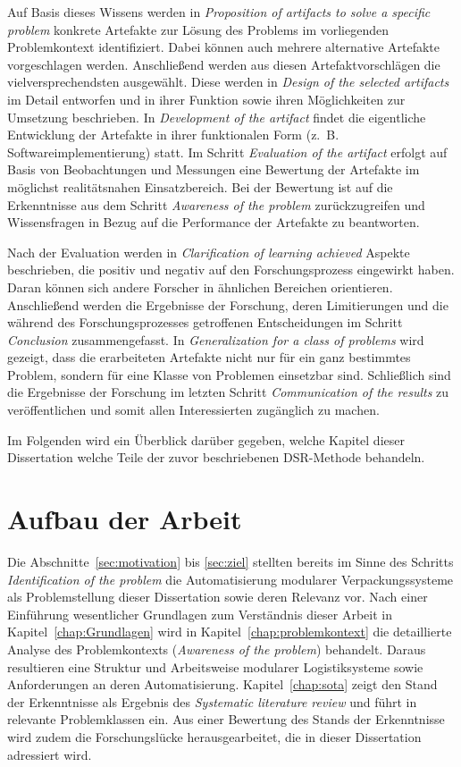 Auf Basis dieses Wissens werden in \emph{Proposition of artifacts to solve a specific problem} konkrete Artefakte zur Lösung des Problems im vorliegenden Problemkontext identifiziert. Dabei können auch mehrere alternative Artefakte vorgeschlagen werden. Anschließend werden aus diesen Artefaktvorschlägen die vielversprechendsten ausgewählt. Diese werden in \emph{Design of the selected artifacts} im Detail entworfen und in ihrer Funktion sowie ihren Möglichkeiten zur Umsetzung beschrieben. In \emph{Development of the artifact} findet die eigentliche Entwicklung der Artefakte in ihrer funktionalen Form (z.~B. Softwareimplementierung) statt. Im Schritt \emph{Evaluation of the artifact} erfolgt auf Basis von Beobachtungen und Messungen eine Bewertung der Artefakte im möglichst realitätsnahen Einsatzbereich. Bei der Bewertung ist auf die Erkenntnisse aus dem Schritt \emph{Awareness of the problem} zurückzugreifen und Wissensfragen in Bezug auf die Performance der Artefakte zu beantworten. 

Nach der Evaluation werden in \emph{Clarification of learning achieved} Aspekte beschrieben, die positiv und negativ auf den Forschungsprozess eingewirkt haben. Daran können sich andere Forscher in ähnlichen Bereichen orientieren. Anschließend werden die Ergebnisse der Forschung, deren Limitierungen und die während des Forschungsprozesses getroffenen Entscheidungen im Schritt \emph{Conclusion} zusammengefasst. In \emph{Generalization for a class of problems} wird gezeigt, dass die erarbeiteten Artefakte nicht nur für ein ganz bestimmtes Problem, sondern für eine Klasse von Problemen einsetzbar sind. Schließlich sind die Ergebnisse der Forschung im letzten Schritt \emph{Communication of the results} zu veröffentlichen und somit allen Interessierten zugänglich zu machen.

Im Folgenden wird ein Überblick darüber gegeben, welche Kapitel dieser Dissertation welche Teile der zuvor beschriebenen DSR-Methode behandeln.

\section{Aufbau der Arbeit}
\label{chap:aufbau}

Die Abschnitte~\ref{sec:motivation} bis \ref{sec:ziel} stellten bereits im Sinne des Schritts \emph{Identification of the problem} die Automatisierung modularer Verpackungssysteme als Problemstellung dieser Dissertation sowie deren Relevanz vor. Nach einer Einführung wesentlicher Grundlagen zum Verständnis dieser Arbeit in Kapitel~\ref{chap:Grundlagen} wird in Kapitel~\ref{chap:problemkontext} die detaillierte Analyse des Problemkontexts (\emph{Awareness of the problem}) behandelt. Daraus resultieren eine Struktur und Arbeitsweise modularer Logistiksysteme sowie Anforderungen an deren Automatisierung. Kapitel~\ref{chap:sota} zeigt den Stand der Erkenntnisse als Ergebnis des \emph{Systematic literature review} und führt in relevante Problemklassen ein. Aus einer Bewertung des Stands der Erkenntnisse wird zudem die Forschungslücke herausgearbeitet, die in dieser Dissertation adressiert wird.

